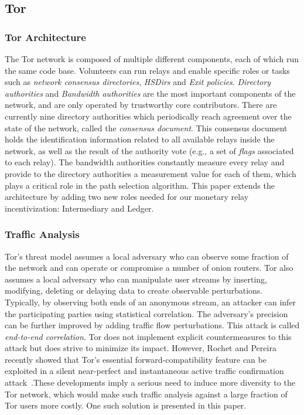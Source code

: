 \subsection{Tor}

\subsubsection{Tor Architecture}
The Tor network is composed of multiple different components, each of which run
the same code base. Volunteers can run relays and enable specific roles or tasks
such as \textit{network consensus directories}, \textit{HSDirs} and \textit{Exit
  policies}. \textit{Directory authorities} and \textit{Bandwidth authorities}
are the most important components of the network, and are only operated by
trustworthy core contributors. There are currently nine directory authorities
which periodically reach agreement over the state of the network, called the
\textit{consensus document}. This consensus document holds the identification
information related to all available relays inside the network, as well as the
result of the authority vote (e.g., a set of \textit{flags} associated to each
relay). The bandwidth authorities constantly measure every relay and provide to
the directory authorities a measurement value for each of them, which plays a
critical role in the path selection algorithm. This paper extends the
architecture by adding two new roles needed for our monetary relay
incentivization: Intermediary and Ledger.

\subsubsection{Traffic Analysis}
Tor's threat model assumes a local adversary who can observe some fraction of
the network and can operate or compromise a number of onion routers. Tor also
assumes a local adversary who can manipulate user streams by inserting,
modifying, deleting or delaying data to create observable
perturbations. Typically, by observing both ends of an anonymous stream, an
attacker can infer the participating parties using statistical correlation. The
adversary's precision can be further improved by adding traffic flow
perturbations. This attack is called \textit{end-to-end correlation}. Tor does
not implement explicit countermeasures to this attack but does strive to
minimize its impact. However, Rochet and Pereira recently showed that Tor's
essential forward-compatibility feature can be exploited in a silent
near-perfect and instantaneous active traffic confirmation
attack~\cite{rochet2018dropping}.These developments imply a serious need to
induce more diversity to the Tor network, which would make such traffic analysis
against a large fraction of Tor users more costly. One such solution is
presented in this paper.

